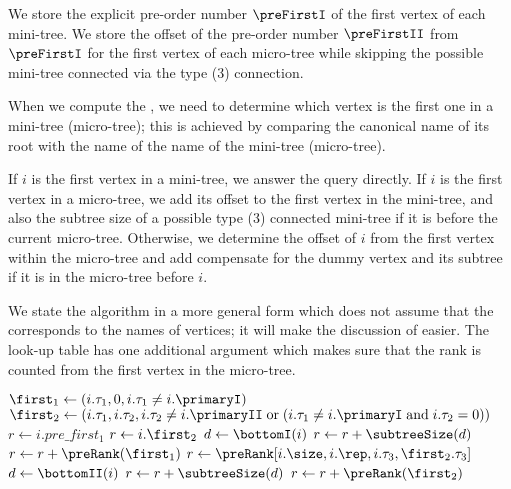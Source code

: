 We store the explicit pre-order number $\preFirstI$ of the first vertex of each mini-tree.
We store the offset of the pre-order number $\preFirstII$ from $\preFirstI$ for the first vertex of each micro-tree while skipping the possible mini-tree connected via the type (3) connection.

When we compute the \preRank{}, we need to determine which vertex is the first one in a mini-tree (micro-tree); this is achieved by comparing the canonical name of  its root with the name of the name of the mini-tree (micro-tree).

If $i$ is the first vertex in a mini-tree, we answer the query directly.
If $i$ is the first vertex in a micro-tree, we add its offset to the first vertex in the mini-tree, and also the subtree size of a possible type (3) connected mini-tree if it is before the current micro-tree.
Otherwise, we determine the offset of $i$ from the first vertex within the micro-tree and add compensate for the dummy vertex and its subtree if it is in the micro-tree before $i$.

We state the algorithm in a more general form which does not assume that the \preRank{} corresponds to the names of vertices; it will make the discussion of \postRank{} easier.
The look-up table \preRank{} has one additional argument which makes sure that the rank is counted from the first vertex in the micro-tree.

\begin{algorithm}
\begin{algorithmic}
	\State $\first_1 \gets (i.\tau_1, 0, i.\tau_1 \ne i.\primaryI)$
	\State $\first_2 \gets (i.\tau_1, i.\tau_2, i.\tau_2 \ne i.\primaryII \boolor (i.\tau_1 \ne i.\primaryI \booland i.\tau_2 = 0))$
	 
		\State $r \gets i.pre\_first_1$
	 
		\State $r \gets i.\first_2$
			\State $d \gets \bottomI(i)$
			\State $r \gets r + \subtreeSize(d)$ 
		\EndIf
		\State $r \gets r + \preRank(\first_1)$
	\Else {}
		\State $r \gets \preRank[i.\size, i.\rep, i.\tau_3, \first_2.\tau_3]$
			\State $d \gets \bottomII(i)$
			\State $r \gets r + \subtreeSize(d)$ 
		\EndIf
		\State $r \gets r + \preRank(\first_2)$
	\EndIf
	
	\State {}
\EndFunction
\end{algorithmic}
\end{algorithm}

